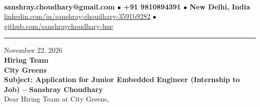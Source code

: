 \documentclass[10pt,a4paper]{article}%
\begin{document}
%
 \vspace{3pt}\\%
\noindent \textbf{\footnotesize sanshray.choudhary@gmail.com $\bullet$ +91 9810894391 $\bullet$ New Delhi, India}\\%
\noindent \href{https://www.linkedin.com/in/sanshray-choudhary-3591b9282}{linkedin.com/in/sanshray-choudhary-3591b9282} $\bullet$ \href{https://github.com/sanshraychoudhary-hue}{github.com/sanshraychoudhary-hue} \vspace{12pt}%
\hrule \vspace{18pt}%

\noindent November 22, 2026 \vspace{12pt}\\%
\noindent \textbf{Hiring Team} \\%
\noindent \textbf{City Greens} \vspace{16pt}\\%

\noindent \textbf{Subject: Application for Junior Embedded Engineer (Internship to Job) -- Sanshray Choudhary} \vspace{12pt}\\%

\noindent Dear Hiring Team at City Greens, \vspace{8pt}\\%
\end{document}
